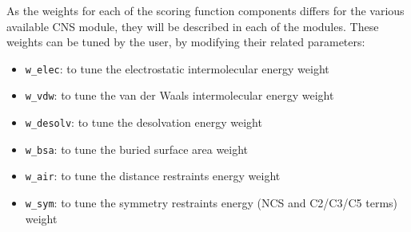 As the weights for each of the scoring function components differs for the various
available CNS module, they will be described in each of the modules. These weights
can be tuned by the user, by modifying their related parameters:
\begin{itemize}
    \item \verb|w_elec|: to tune the electrostatic intermolecular energy weight
    \item \verb|w_vdw|: to tune the van der Waals intermolecular energy weight
    \item \verb|w_desolv|: to tune the desolvation energy weight
    \item \verb|w_bsa|: to tune the buried surface area weight
    \item \verb|w_air|: to tune the distance restraints energy weight
    \item \verb|w_sym|: to tune the symmetry restraints energy (NCS and C2/C3/C5 terms) weight
\end{itemize}

